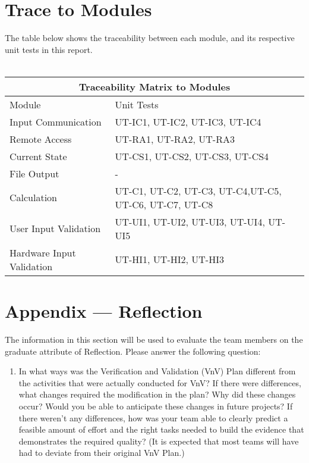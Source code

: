 \documentclass[12pt, titlepage]{article}
\begin{document}
\section{Trace to Modules}		
The table below shows the traceability between each module, and its respective unit tests in this report.\\
\\
\begin{tabular}{ |p{5cm}||p{5cm}| }
  \hline
  \multicolumn{2}{|c|}{Traceability Matrix to Modules} \\
  \hline
  Module & Unit Tests \\
  \hline
  Input Communication   & UT-IC1, UT-IC2, UT-IC3, UT-IC4  \\ \hline
  Remote Access   & UT-RA1, UT-RA2, UT-RA3   \\ \hline
  Current State   & UT-CS1, UT-CS2, UT-CS3, UT-CS4   \\ \hline
  File Output   & -  \\ \hline
  Calculation   & UT-C1, UT-C2, UT-C3, UT-C4,UT-C5, UT-C6, UT-C7, UT-C8   \\ \hline
  User Input Validation  & UT-UI1, UT-UI2, UT-UI3, UT-UI4, UT-UI5   \\ \hline
  Hardware Input Validation  & UT-HI1, UT-HI2, UT-HI3  \\ \hline
  
 \end{tabular}


% 

\newpage{}
\section*{Appendix --- Reflection}

The information in this section will be used to evaluate the team members on the
graduate attribute of Reflection.  Please answer the following question:

\begin{enumerate}
  \item In what ways was the Verification and Validation (VnV) Plan different
  from the activities that were actually conducted for VnV?  If there were
  differences, what changes required the modification in the plan?  Why did
  these changes occur?  Would you be able to anticipate these changes in future projects?  If there weren't any differences, how was your team able to clearly predict a feasible amount of effort and the right tasks needed to build the evidence that demonstrates the required quality?  (It is expected that most teams will have had to deviate from their original VnV Plan.)
\end{enumerate}
\end{document}
